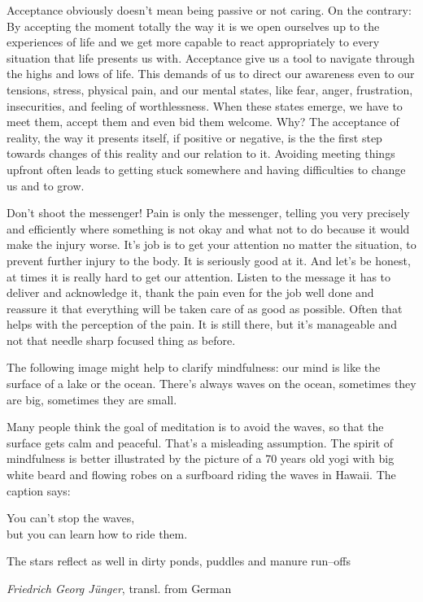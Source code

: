 \documentclass[../Book.Stress_regulation.tex]{subfiles}
\begin{document}
Acceptance obviously doesn’t mean being passive or not caring.
On the contrary: By {accepting the moment} totally the way it is we {open ourselves} up to the experiences of life   
and we get more capable to {react appropriately} to every situation that life presents us with.
Acceptance give us a tool to navigate through the highs and lows of life. This demands of us to direct our awareness even to our tensions, stress, physical pain, and our mental states, like fear,
anger, frustration, insecurities, and feeling of worthlessness.
When these states emerge, {we have to meet them}, accept them and even bid them welcome.
Why? The acceptance of reality, the way it presents itself, if positive or negative, is the the {first step towards changes} of this reality and our relation to it.
 Avoiding meeting things upfront often leads to getting stuck somewhere and having difficulties to change us and to grow.


 {Don't shoot the messenger!}
Pain is only the messenger, telling you very precisely and efficiently {where something is not okay} and {what not to do} because it would make the injury worse.
It's job is to {get your attention} no matter the situation, to prevent further injury to the body. It is seriously good at it. And let's be honest, at times it is really hard to get our attention.
Listen to the message it has to deliver and {acknowledge it}, thank the pain even for the job well done and reassure it that everything will be taken care of as good as possible. 
Often that helps with the {perception of the pain}. It is still there, but it's manageable and not that needle sharp focused thing as before.

The following image might help to clarify mindfulness: {our mind is like the surface of a lake or the ocean}.
There's always {waves on the ocean}, sometimes they are big, sometimes they are small. 

Many people think the goal of meditation is to avoid the waves, so that the surface gets calm and peaceful. That's a misleading assumption.
The spirit of mindfulness is better illustrated by the picture of a 70 years old yogi with big white beard and flowing robes on a surfboard riding the waves in Hawaii. The caption says:
\begin{center}
You can't stop the waves, \\
but you can learn how to ride them.
\end{center}

\epigraph{The stars reflect as well in dirty ponds, puddles and manure run--offs}{\textit{Friedrich Georg J\"unger}, transl. from German}
\end{document}

